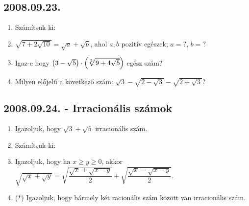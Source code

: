 \subsection*{2008.09.23.}
\begin{enumerate}
\item Számítsuk ki:
\item $\sqrt{7+2\sqrt{10}}=\sqrt{a}+\sqrt{b}$, ahol $a,b$ pozitív egészek; $a=?$, $b=?$
\item Igaz-e hogy $\left(3-\sqrt{5}\right)\cdot \left(\root3\of{9+4\sqrt{5}}\right)$ egész szám?
\item Milyen előjelű a következő szám: $\sqrt{3}-\sqrt{2-\sqrt{3}}-\sqrt{2+\sqrt{3}}$?
\end{enumerate}

\subsection*{2008.09.24. - Irracionális számok}
\begin{enumerate}
\item Igazoljuk, hogy $\sqrt{3}+\sqrt{5}$ irracionális szám.
\item Számítsuk ki:
\item Igazoljuk, hogy ha $x\geq y\geq 0$, akkor $\sqrt{\sqrt{x}+\sqrt{y}}=\sqrt{\dfrac{\sqrt{x}+\sqrt{x-y}}{2}}+\sqrt{\dfrac{\sqrt{x}-\sqrt{x-y}}{2}}$.
\item ($*$) Igazoljuk, hogy bármely két racionális szám között van irracionális szám.
\end{enumerate}

